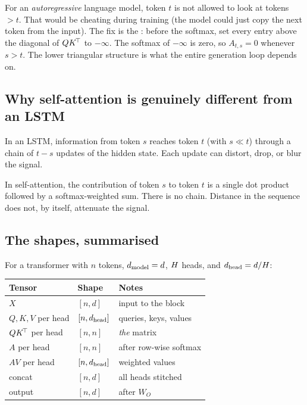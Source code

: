 For an \emph{autoregressive} language model, token \(t\) is not allowed to
look at tokens \(> t\). That would be cheating during training (the model
could just copy the next token from the input). The fix is the
: before the softmax, set every entry above the diagonal
of \(QK^{\!\top}\) to \(-\infty\). The softmax of \(-\infty\) is zero, so
\(A_{t,s} = 0\) whenever \(s > t\). The lower triangular structure is
what the entire generation loop depends on.

\subsection{Why self-attention is genuinely different from an LSTM}

In an LSTM, information from token \(s\) reaches token \(t\) (with \(s \ll t\))
through a chain of \(t - s\) updates of the hidden state. Each update can
distort, drop, or blur the signal.

In self-attention, the contribution of token \(s\) to token \(t\) is a single
dot product followed by a softmax-weighted sum. There is no chain. Distance
in the sequence does not, by itself, attenuate the signal.


\subsection{The shapes, summarised}

For a transformer with \(n\) tokens, \(d_{\text{model}} = d\), \(H\) heads, and
\(d_{\text{head}} = d / H\):

\begin{center}
\begin{tabular}{lll}
\toprule
Tensor & Shape & Notes \\
\midrule
\(X\)   & \([n, d]\)              & input to the block \\
\(Q, K, V\) per head & \([n, d_{\text{head}}]\) & queries, keys, values \\
\(QK^{\!\top}\) per head & \([n, n]\)    & \emph{the} matrix \\
\(A\) per head    & \([n, n]\)    & after row-wise softmax \\
\(AV\) per head   & \([n, d_{\text{head}}]\) & weighted values \\
concat            & \([n, d]\)    & all heads stitched \\
output            & \([n, d]\)    & after \(W_O\) \\
\bottomrule
\end{tabular}
\end{center}

